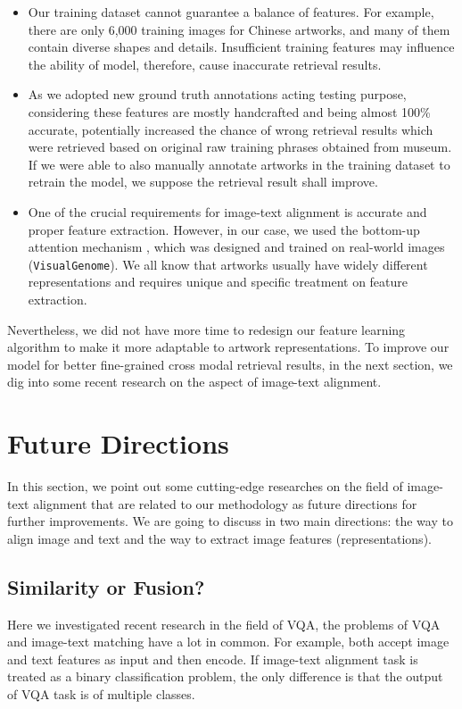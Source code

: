 \begin{itemize}
    \item Our training dataset cannot guarantee a balance of features. For example, there are only 6,000 training images for Chinese artworks, and many of them contain diverse shapes and details. Insufficient training features may influence the ability of model, therefore, cause inaccurate retrieval results.
    \item As we adopted new ground truth annotations acting testing purpose, considering these features are mostly handcrafted and being almost 100\% accurate, potentially increased the chance of wrong retrieval results which were retrieved based on original raw training phrases obtained from museum. If we were able to also manually annotate artworks in the training dataset to retrain the model, we suppose the retrieval result shall improve.
    \item One of the crucial requirements for image-text alignment is accurate and proper feature extraction. However, in our case, we used the bottom-up attention mechanism \cite{bottomup}, which was designed and trained on real-world images (\verb|VisualGenome|). We all know that artworks usually have widely different representations and requires unique and specific treatment on feature extraction.
\end{itemize}

Nevertheless, we did not have more time to redesign our feature learning algorithm to make it more adaptable to artwork representations. To improve our model for better fine-grained cross modal retrieval results, in the next section, we dig into some recent research on the aspect of image-text alignment. 

\section{Future Directions}
In this section, we point out some cutting-edge researches on the field of image-text alignment that are related to our methodology as future directions for further improvements. We are going to discuss in two main directions: the way to align image and text and the way to extract image features (representations).

\subsection{Similarity or Fusion?}
Here we investigated recent research in the field of VQA, the problems of VQA and image-text matching have a lot in common. For example, both accept image and text features as input and then encode. If image-text alignment task is treated as a binary classification problem, the only difference is that the output of VQA task is of multiple classes.

